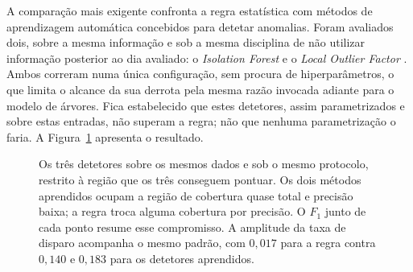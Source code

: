A comparação mais exigente confronta a regra estatística com métodos de aprendizagem automática
concebidos para detetar anomalias. Foram avaliados dois, sobre a mesma informação e sob a mesma
disciplina de não utilizar informação posterior ao dia avaliado: o \emph{Isolation Forest}
\autocite{liu2008isolation} e o \emph{Local Outlier Factor} \autocite{breunig2000lof}. Ambos correram numa única configuração, sem procura de hiperparâmetros, o que limita o alcance da
sua derrota pela mesma razão invocada adiante para o modelo de árvores. Fica estabelecido que
estes detetores, assim parametrizados e sobre estas entradas, não superam a regra; não que nenhuma
parametrização o faria. A Figura~\ref{fig:av_detetores} apresenta o resultado.

\begin{figure}[htbp]
\centering
{}
\caption[A regra transparente contra dois detetores aprendidos]{Os três detetores sobre os mesmos
dados e sob o mesmo protocolo, restrito à região que os três conseguem pontuar. Os dois métodos
aprendidos ocupam a região de cobertura quase total e precisão baixa; a regra troca alguma
cobertura por precisão. O $F_1$ junto de cada ponto resume esse compromisso. A amplitude da taxa de disparo acompanha o mesmo padrão, com
$0{,}017$ para a regra contra $0{,}140$ e $0{,}183$ para os detetores aprendidos.}
\label{fig:av_detetores}
\end{figure}

